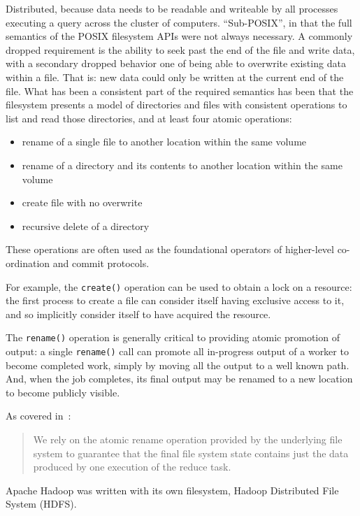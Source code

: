 \documentclass[conference]{IEEEtran}
\begin{document}
Distributed, because data needs to be readable and writeable by all processes
executing a query across the cluster of computers.
``Sub-POSIX'', in that the full semantics of the POSIX filesystem APIs were not always necessary.
A commonly dropped requirement is the ability to seek past the end of the file and
write data, with a secondary dropped behavior one of being able to overwrite existing
data within a file.
That is: new data could only be written at the current end of the file.
What has been a consistent part of the required semantics has been that the filesystem
presents a model of directories and files with consistent operations to list and
read those directories, and at least four atomic operations:

\begin{itemize}
  \item rename of a single file to another location within the same volume 
  \item rename of a directory and its contents to another location within the same volume 
  \item create file with no overwrite 
  \item recursive delete of a directory 
\end{itemize}

These operations are often used as the foundational operators of higher-level
co-ordination and commit protocols.

For example, the \texttt{create()} operation can be used to obtain a lock on a resource:
the first process to create a file can consider itself having exclusive access to it,
and so implicitly consider itself to have acquired the resource.

The \texttt{rename()} operation is generally critical to providing atomic promotion
of output: a single \texttt{rename()} call can promote all in-progress output
of a worker to become completed work, simply by moving all the output to a well known path.
And, when the job completes, its final output may be renamed to a new location to become
publicly visible.

As covered in\ \cite{MapReduce}:

\begin{quote}
We rely on the atomic rename operation provided by the underlying file system
to guarantee that the final file system state contains just the data produced
by one execution of the reduce task.
\end{quote}


Apache Hadoop was written with its own filesystem, Hadoop Distributed File System (HDFS).
\end{document}
